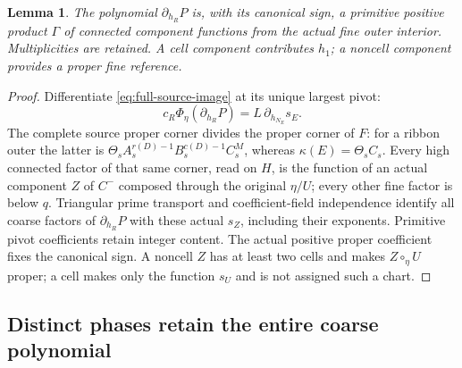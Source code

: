 \documentclass[11pt,a4paper]{amsart}
\numberwithin{equation}{section}
\theoremstyle{plain}
\newtheorem{lemma}[theorem]{Lemma}
\theoremstyle{definition}
\begin{document}
\begin{lemma}\label{lem:derivative-stock}
The polynomial \(\partial_{h_R}P\) is, with its canonical sign, a primitive
positive product \(\Gamma\) of connected component functions from the actual
fine outer interior.  Multiplicities are retained.  A cell component
contributes \(h_1\); a noncell component provides a proper fine reference.
\end{lemma}
\begin{proof}
Differentiate \eqref{eq:full-source-image} at its unique largest pivot:
\[
 c_R\Phi_\eta(\partial_{h_R}P)=L\,\partial_{h_{N_E}}s_E.
\]
The complete source proper corner divides the proper corner of \(F\):
for a ribbon outer the latter is
\(\Theta_s A_s^{r(D)-1}B_s^{c(D)-1}C_s^M\), whereas
\(\kappa(E)=\Theta_s C_s\).  Every high connected factor of that same corner,
read on \(H\), is the function of an actual component \(Z\) of \(C^-\) composed
through the original \(\eta/U\); every other fine factor is below \(q\).
Triangular prime transport and coefficient-field independence identify
all coarse factors of \(\partial_{h_R}P\) with these actual \(s_Z\), including
their exponents.  Primitive pivot coefficients retain integer content.
The actual positive proper coefficient fixes the canonical sign.
A noncell \(Z\) has at least two cells and makes \(Z\circ_\eta U\) proper;
a cell makes only the function \(s_U\) and is not assigned such a chart.
\end{proof}

\subsection{Distinct phases retain the entire coarse polynomial}
\end{document}
